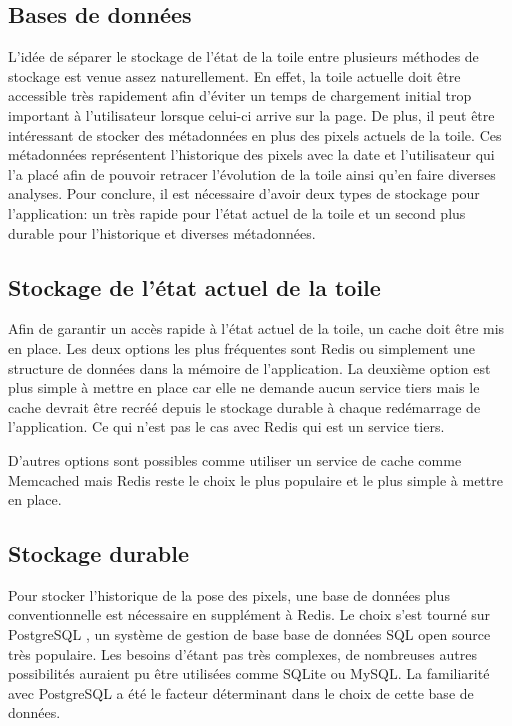 \subsection{Bases de données}

L'idée de séparer le stockage de l'état de la toile entre plusieurs méthodes de stockage est venue assez naturellement. En effet, la toile actuelle doit être accessible très rapidement afin d'éviter un temps de chargement initial trop important à l'utilisateur lorsque celui-ci arrive sur la page. De plus, il peut être intéressant de stocker des métadonnées en plus des pixels actuels de la toile. Ces métadonnées représentent l'historique des pixels avec la date et l'utilisateur qui l'a placé afin de pouvoir retracer l'évolution de la toile ainsi qu'en faire diverses analyses. Pour conclure, il est nécessaire d'avoir deux types de stockage pour l'application: un très rapide pour l'état actuel de la toile et un second plus durable pour l'historique et diverses métadonnées.

\subsection{Stockage de l'état actuel de la toile}

Afin de garantir un accès rapide à l'état actuel de la toile, un cache doit être mis en place. Les deux options les plus fréquentes sont Redis ou simplement une structure de données dans la mémoire de l'application. La deuxième option est plus simple à mettre en place car elle ne demande aucun service tiers mais le cache devrait être recréé depuis le stockage durable à chaque redémarrage de l'application. Ce qui n'est pas le cas avec Redis qui est un service tiers.

D'autres options sont possibles comme utiliser un service de cache comme Memcached mais Redis reste le choix le plus populaire et le plus simple à mettre en place.

\subsection{Stockage durable}

Pour stocker l'historique de la pose des pixels, une base de données plus conventionnelle est nécessaire en supplément à Redis. Le choix s'est tourné sur PostgreSQL \cite{postgresql}, un système de gestion de base base de données SQL open source très populaire. Les besoins d'étant pas très complexes, de nombreuses autres possibilités auraient pu être utilisées comme SQLite ou MySQL. La familiarité avec PostgreSQL a été le facteur déterminant dans le choix de cette base de données.
